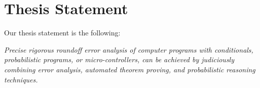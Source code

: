 \section{Thesis Statement}
%
Our thesis statement is the following: 

%
\emph{
Precise rigorous roundoff error analysis of computer programs with conditionals, probabilistic programs, or micro-controllers, can be achieved by judiciously combining error analysis, automated theorem proving, and probabilistic reasoning techniques.
%
%	
%
%
%
%
%
}

%
%
%
%

